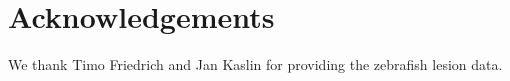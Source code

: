 
\section*{Acknowledgements}
  \label{sec:acknowledgements}

  We thank Timo Friedrich and Jan Kaslin for providing the zebrafish lesion data.
